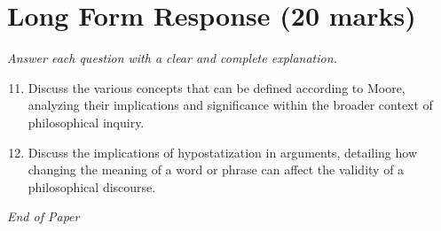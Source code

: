 \documentclass[12pt]{article}
\begin{document}
\section*{Long Form Response (20 marks)}
\textit{Answer each question with a clear and complete explanation.}
\begin{enumerate}[label=\arabic*.]
\setcounter{enumi}{10}
\item Discuss the various concepts that can be defined according to Moore, analyzing their implications and significance within the broader context of philosophical inquiry.
\item Discuss the implications of hypostatization in arguments, detailing how changing the meaning of a word or phrase can affect the validity of a philosophical discourse.
\end{enumerate}

\vfill
\noindent\textit{End of Paper}
\end{document}

